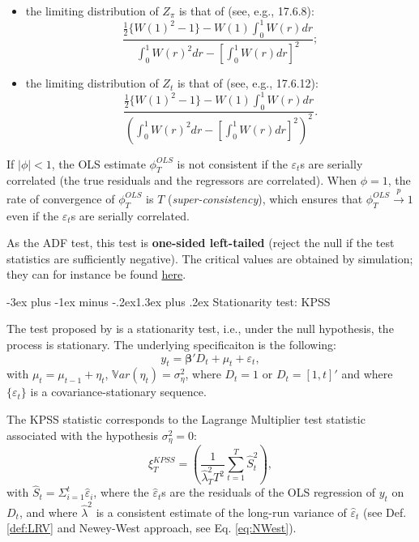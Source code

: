 \documentclass[
  11pt,
]{book}
\makeatletter
\providecommand{\tightlist}{%
  \setlength{\itemsep}{0pt}\setlength{\parskip}{0pt}}
\renewcommand\section{\@startsection{section}{1}{\z@}
  {-3ex plus -1ex minus -.2ex}{1.3ex plus .2ex}
  {\normalfont\Large\bfseries\color{TextbookInk}}}
\theoremstyle{definition}
\theoremstyle{definition}
\theoremstyle{definition}
\theoremstyle{definition}
\theoremstyle{remark}
\makeatother
\begin{document}
\begin{itemize}
\tightlist
\item
  the limiting distribution of \(Z_\pi\) is that of (see, e.g., \citet{Hamilton_1994} 17.6.8):
  \[
  \frac{\frac{1}{2}\{W(1)^2 - 1\} - W(1)\int_0^1 W(r)dr}{\int_0^1 W(r)^2dr-\left[\int_0^1 W(r)dr\right]^2};
  \]
\item
  the limiting distribution of \(Z_t\) is that of (see, e.g., \citet{Hamilton_1994} 17.6.12):
  \[
  \frac{\frac{1}{2}\{W(1)^2 - 1\} - W(1)\int_0^1 W(r)dr}{\left(\int_0^1 W(r)^2dr-\left[\int_0^1 W(r)dr\right]^2\right)^2}.
  \]
\end{itemize}

If \(|\phi|<1\), the OLS estimate \(\phi^{OLS}_T\) is not consistent if the \(\varepsilon_t\)s are serially correlated (the true residuals and the regressors are correlated). When \(\phi=1\), the rate of convergence of \(\phi^{OLS}_T\) is \(T\) (\emph{super-consistency}), which ensures that \(\phi^{OLS}_T \overset{p}{\rightarrow} 1\) even if the \(\varepsilon_t\)s are serially correlated.

As the ADF test, this test is \textbf{one-sided left-tailed} (reject the null if the test statistics are sufficiently negative). The critical values are obtained by simulation; they can for instance be found \href{http://www.econ.uiuc.edu/~econ508/DFtable.pdf}{here}.

\section{Stationarity test: KPSS}\label{stationarity-test-kpss}

The test proposed by \citet{KWIATKOWSKI1992159} is a stationarity test, i.e., under the null hypothesis, the process is stationary. The underlying specificaiton is the following:
\[
y_t = \boldsymbol\beta' D_t + \mu_t + \varepsilon_t,
\]
with \(\mu_t = \mu_{t-1} + \eta_t\), \(\mathbb{V}ar(\eta_t)=\sigma_\eta^2\), where \(D_t = 1\) or \(D_t = [1,t]'\) and where \(\{\varepsilon_t\}\) is a covariance-stationary sequence.

The KPSS statistic corresponds to the Lagrange Multiplier test statistic associated with the hypothesis \(\sigma_\eta^2=0\):
\[
\boxed{\xi^{KPSS}_T = \left(\frac{1}{\hat\lambda_T^2 T^2}\sum_{t=1}^T\hat{S}_t^2\right),}
\]
with \(\hat{S}_t=\Sigma_{i=1}^t \hat{\varepsilon}_i\), where the \(\hat{\varepsilon}_t\)s are the residuals of the OLS regression of \(y_t\) on \(D_t\), and where \(\hat\lambda^2\) is a consistent estimate of the long-run variance of \(\hat{\varepsilon}_t\) (see Def. \ref{def:LRV} and Newey-West approach, see Eq. \eqref{eq:NWest}).
\end{document}
